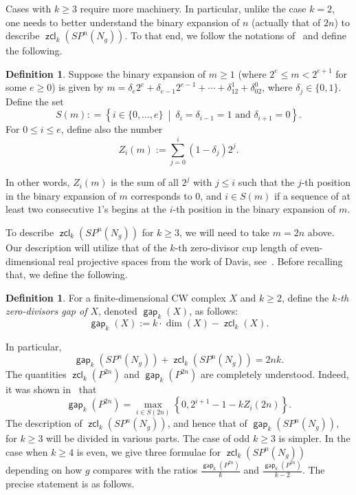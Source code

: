 \documentclass[amscd,amssymb,verbatim,10pt]{amsart}
\numberwithin{equation}{section}
\theoremstyle{plain}
\theoremstyle{definition}
\newtheorem{definition}[thm]{Definition}
\DeclareMathOperator{\zcl}{{\mathsf{zcl}}}
\DeclareMathOperator{\gap}{{\mathsf{gap}}}
\begin{document}
Cases with $k\ge 3$ require more machinery. In particular, unlike the case $k=2$, one needs to better understand the binary expansion of $n$ (actually that of $2n$) to describe $\zcl_k(SP^n(N_g))$. To that end, we follow the notations of~\cite{Dav} and define the following.

\begin{definition}\label{defn: notation}
    Suppose the binary expansion of $m\ge 1$ (where $2^e\le m<2^{e+1}$ for some $e\ge 0$) is given by $m=\delta_e2^e+\delta_{e-1}2^{e-1}+\cdots +\delta_12^1+\delta_02^0$, where $\delta_j\in \{0,1\}$. Define the set
    \[
    S(m): = \left\{ i\in\{0,\ldots,e\} \ \middle| \ \delta_i=\delta_{i-1}=1 \text{ and } \delta_{i+1}=0 \right\}.
    \]
    For $0\le i \le e$, define also the number
    \[
    Z_i(m):=\sum_{j=0}^i\left(1-\delta_j\right)2^j.
    \]
\end{definition}

In other words, $Z_i(m)$ is the sum of all $2^j$ with $j\le i$ such that the $j$-th position in the binary expansion of $m$ corresponds to $0$, and $i\in S(m)$ if a sequence of at least two consecutive $1$'s begins at the $i$-th position in the binary expansion of $m$.

To describe $\zcl_k(SP^n(N_g))$ for $k\ge 3$, we will need to take $m=2n$ above. Our description will utilize that of the $k$-th zero-divisor cup length of even-dimensional real projective spaces from the work of Davis, see~\cite{Dav}. Before recalling that, we define the following.

\begin{definition}\label{gapdefinido}
    For a finite-dimensional CW complex $X$ and $k\ge 2$, define the $k$\emph{-th zero-divisors gap of $X$}, denoted $\gap_k(X)$, as follows:
    \[
    \gap_k(X):=k\cdot\dim(X)-\zcl_k(X).
    \]
\end{definition}

In particular,
\begin{equation}
\label{lasuma}
\gap_k(SP^n(N_g))+\zcl_k(SP^n(N_g))=2nk.
\end{equation}
The quantities $\zcl_k(P^{2n})$ and $\gap_k(P^{2n})$ are completely understood. Indeed, it was shown in~\cite{Dav} that
\begin{equation}\label{eq: davis gap main}
\gap_k(P^{2n})=\max_{i\in S(2n)}\left\{0,2^{i+1}-1-kZ_i(2n)\right\}.    
\end{equation}
The description of $\zcl_k(SP^n(N_g))$, and hence that of $\gap_k(SP^n(N_g))$, for $k\ge 3$ will be divided in various parts. The case of odd $k\ge 3$ is simpler. In the case when $k\ge 4$ is even, we give three formulae for $\zcl_k(SP^n(N_g))$ depending on how $g$ compares with the ratios $\tfrac{\gap_k(P^{2n})}{k}$ and $\tfrac{\gap_k(P^{2n})}{k-2}$. The precise statement is as follows.  
\end{document}
